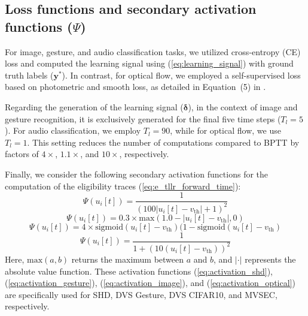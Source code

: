 \documentclass[10pt]{article} %
\begin{document}
        \subsection{Loss functions and secondary activation functions ($\Psi$)}\label{sec:loss_functions}
        For image, gesture, and audio classification tasks, we utilized cross-entropy (CE) loss and computed the learning signal using (\ref{eq:learning_signal}) with ground truth labels ($\mathbf{y^*}$). 
        In contrast, for optical flow, we employed a self-supervised loss based on photometric and smooth loss, as detailed in Equation~(5) in \cite{Lee2020Spike-FlowNet:Networks}.

        Regarding the generation of the learning signal ($\boldsymbol{\delta}$), in the context of image and gesture recognition, it is exclusively generated for the final five time steps ($T_l=5$). 
        For audio classification, we employ $T_l=90$, while for optical flow, we use $T_l=1$. 
        This setting reduces the number of computations compared to BPTT by factors of $4\times$, $1.1\times$, and $10\times$, respectively.

        Finally, we consider the following secondary activation functions for the computation of the eligibility traces (\ref{eq:e_tllr_forward_time}): 
        \begin{equation}
            \Psi(u_i[t]) = \frac{1}{(100 |u_{i}[t]-v_\mathrm{th}| + 1)^ 2}
            \label{eq:activation_shd}
        \end{equation}
        \begin{equation}
            \Psi(u_i[t]) = 0.3\times \mathrm{max}(1.0 - |u_{i}[t]-v_\mathrm{th}|, 0)
             \label{eq:activation_gesture}
        \end{equation}
        \begin{equation}
            \Psi(u_i[t]) = 4\times\mathrm{sigmoid}(u_{i}[t]-v_\mathrm{th})(1-\mathrm{sigmoid}(u_{i}[t]-v_\mathrm{th})
             \label{eq:activation_image}
        \end{equation}
        \begin{equation}
            \Psi(u_i[t]) = \frac{1}{1 + (10 (u_{i}[t]-v_\mathrm{th}))^2}
             \label{eq:activation_optical}
        \end{equation}
        Here, $\mathrm{max}(a, b)$ returns the maximum between $a$ and $b$, and $|\cdot|$ represents the absolute value function. 
        These activation functions (\ref{eq:activation_shd}), (\ref{eq:activation_gesture}), (\ref{eq:activation_image}), and (\ref{eq:activation_optical}) are specifically used for SHD, DVS Gesture, DVS CIFAR10, and MVSEC, respectively.
        
\end{document}
